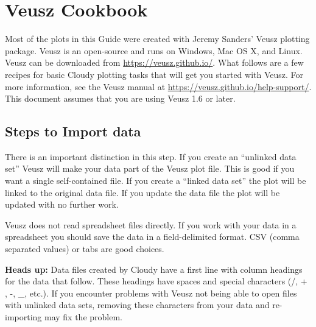 

%





\section{Veusz Cookbook}
\label{sec:VeuszCookbook}

Most of the plots in this Guide were created with Jeremy Sanders' Veusz plotting package.
Veusz is an open-source and runs on Windows, Mac OS X,
and Linux. Veusz can be downloaded from \url{https://veusz.github.io/}. What follows are a few recipes for basic Cloudy plotting tasks that will get you started with Veusz. For more information, see the Veusz manual at \url{https://veusz.github.io/help-support/}. 
This document assumes that you are using Veusz 1.6 or later.

\subsection{Steps to Import data}

There is an important distinction in this step.
If you create an ``unlinked data set'' Veusz will make your data part of the
Veusz plot file. 
This is good if you want a single self-contained file.
If you create a ``linked data set'' the plot will be linked to the original
data file.  If you update the data file the plot will be updated with no further work.

Veusz does not read spreadsheet files directly.
If you work with your data in a spreadsheet you should save the
data in a field-delimited format.
CSV (comma separated values) or tabs are good choices.

\textbf{Heads up:} Data files created by Cloudy have a first line with 
column headings for the data that follow. These headings have spaces and 
special characters (/, + , -, {\_}, etc.). If you encounter problems with 
Veusz not being able to open files with unlinked data sets, removing 
these characters from your data and re-importing may fix the problem.

